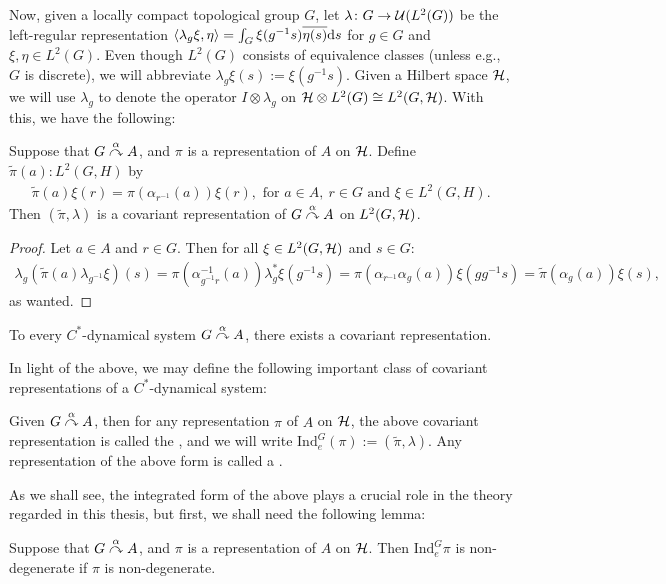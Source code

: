 Now, given a locally compact topological group $G$, let $\lambda \colon G \to \mathcal{U}(L^2(G))$ be the left-regular representation $\langle \lambda_g \xi, \eta\rangle = \int_G \xi(g^{-1}s)\overline{\eta(s)}\mathrm{d} s$ for $g \in G$ and $\xi, \eta \in L^2(G)$. Even though $L^2(G)$ consists of equivalence classes (unless e.g., $G$ is discrete), we will abbreviate $\lambda_g \xi(s) := \xi(g^{-1}s)$. Given a Hilbert space $\mathcal{H}$, we will use $\lambda_g$ to denote the operator $I \otimes \lambda_g$ on $\mathcal{H} \otimes L^2(G) \cong L^2(G,\mathcal{H})$. With this, we have the following:
\begin{lemma}
	Suppose that $G \stackrel{\alpha}{\curvearrowright} A$, and $\pi$ is a representation of $A$ on $\mathcal{H}$. Define $\tilde{\pi}(a) \colon L^2(G,H)$ by 
	\begin{align*}
		\tilde{\pi}(a)\xi(r) = \pi(\alpha_{r^{-1}}(a))\xi(r), \text{ for } a \in A, \ r \in G \text{ and } \xi \in L^2(G,H).
	\end{align*}
	Then $(\tilde{\pi},\lambda)$ is a covariant representation of $G \stackrel{\alpha}{\curvearrowright} A$ on $L^2(G,\mathcal{H})$.
	\label{cross:regularrep}
\end{lemma}
\begin{proof}
	Let $a \in A$ and $r \in G$. Then for all $\xi \in L^2(G,\mathcal{H})$ and $s \in G$:
	\begin{align*}
		\lambda_g (\tilde{\pi}(a) \lambda_{g^{-1}} \xi)(s) = \pi(\alpha_{g^{-1}r}^{-1}(a))\lambda_g^* \xi(g^{-1}s) = \pi(\alpha_{r^{-1}}\alpha_g(a))\xi (g g^{-1} s) = \tilde{\pi}(\alpha_g(a))\xi(s),
	\end{align*}
	as wanted.
\end{proof}
\begin{corollary}
To every $C^*$-dynamical system $G \stackrel{\alpha}{\curvearrowright} A$, there exists a covariant representation.
\end{corollary}
In light of the above, we may define the following important class of covariant representations of a $C^*$-dynamical system:
\begin{definition}
	Given $G \stackrel{\alpha}{\curvearrowright} A$, then for any representation $\pi$ of $A$ on $\mathcal{H}$, the above covariant representation is called the , and we will write $\mathrm{Ind}_e^G(\pi) := (\tilde{\pi}, \lambda)$. Any representation of the above form is called a .
\end{definition}
As we shall see, the integrated form of the above plays a crucial role in the theory regarded in this thesis, but first, we shall need the following lemma:
\begin{lemma}
	Suppose that $G \stackrel{\alpha}{\curvearrowright} A$, and $\pi$ is a representation of $A$ on $\mathcal{H}$. Then $\mathrm{Ind}_e^G \pi$ is non-degenerate if $\pi$ is non-degenerate.
	\label{cross:regrepnondeg}
\end{lemma}
